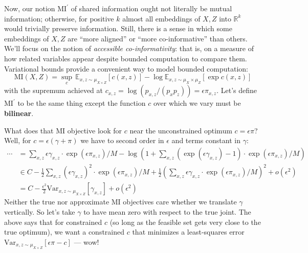 \documentclass[11pt]{article}
\newcommand{\pr}{\prime}
\newcommand{\MI}{\text{MI}}
\newcommand{\Ee}{\mathbb{E}}\newcommand{\eE}{\mathcal{E}}
\newcommand{\Rr}{\mathbb{R}}\newcommand{\rR}{\mathcal{R}}
\theoremstyle{definition}
\begin{document}
        Now, our notion $\MI^\pr$ of shared information ought not literally be
        mutual information; otherwise, for positive $k$ almost all embeddings of
        $X,Z$ into $\Rr^k$ would trivially preserve information. 
        Still, there is a sense in which some embeddings of $X,Z$ are ``more
        aligned'' or ``more co-informative'' than others.  We'll focus on the
        notion of \emph{accessible co-informativity}: that is, on a measure of
        how related variables appear despite bounded computation to compare them.
        Variational bounds provide a convenient way to model bounded computation:
        $$
          \MI(X,Z) = \sup_c\,
          \Ee_{x,z \sim \mu_{X\times Z}} \left[
            c(x,z)
          \right]
          -
          \log
          \Ee_{x,z \sim \mu_{X} \times \mu_{Z}} \left[
          \exp
            c(x,z)
          \right]
        $$
        with the supremum achieved at $c_{x,z}=\log(p_{x,z}/(p_x p_z))=\epsilon \pi_{x,z}$.
        Let's define $\MI^\pr$ to be the same thing except the function $c$ over
        which we vary must be \textbf{bilinear}.
 
        What does that $\MI$ objective look for $c$ near the unconstrained optimum
        $c=\epsilon \pi$?  Well, for $c=\epsilon(\gamma+\pi)$
        we have to second order in $\epsilon$ and terms constant in $\gamma$:
        \begin{align*}
          \cdots
          &=
          \sum_{x,z} \epsilon\gamma_{x,z} \cdot \exp(\epsilon\pi_{x,z})/M
          -
          \log\left(1 + \sum_{x,z} (\exp(\epsilon \gamma_{x,z})-1) \cdot \exp(\epsilon\pi_{x,z})/M\right)
          \\
          &\in
          C-\frac{1}{2}
          \sum_{x,z} (\epsilon\gamma_{x,z})^2 \cdot \exp(\epsilon\pi_{x,z})/M
          +
          \frac{1}{2}
          \left(\sum_{x,z} \epsilon \gamma_{x,z} \cdot \exp(\epsilon\pi_{x,z})/M\right)^2
          + o(\epsilon^2)
          \\
          &=
          C-\frac{\epsilon^2}{2}
            \text{Var}_{x,z\sim \mu_{X\times Z}} [\gamma_{x,z}] + o(\epsilon^2)
        \end{align*}
        Neither the true nor approximate $\MI$ objectives care whether we
        translate $\gamma$ vertically.  So let's take $\gamma$ to have mean zero
        with respect to the true joint.
        The above says that for constrained $c$ (so long as the feasible set
        gets very close to the true optimum), we want a constrained $c$ that
        minimizes a least-squares error 
        $\text{Var}_{x,z\sim \mu_{X\times Z}} [\epsilon\pi - c]$ --- wow!
\end{document}
